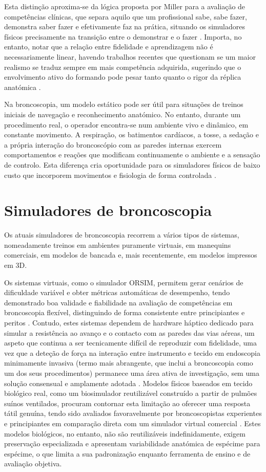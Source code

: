 Esta distinção aproxima-se da lógica proposta por Miller para a avaliação de competências clínicas, que separa aquilo que um profissional sabe, sabe fazer, demonstra saber fazer e efetivamente faz na prática, situando os simuladores físicos precisamente na transição entre o demonstrar e o fazer \parencite{Witheridge2019}. Importa, no entanto, notar que a relação entre fidelidade e aprendizagem não é necessariamente linear, havendo trabalhos recentes que questionam se um maior realismo se traduz sempre em mais competência adquirida, sugerindo que o envolvimento ativo do formando pode pesar tanto quanto o rigor da réplica anatómica \parencite{Pico2026}.

Na broncoscopia, um modelo estático pode ser útil para situações de treinos iniciais de navegação e reconhecimento anatómico. No entanto, durante um procedimento real, o operador encontra-se num ambiente vivo e dinâmico, em constante movimento. A respiração, os batimentos cardíacos, a tosse, a sedação e a própria interação do broncoscópio com as paredes internas exercem comportamentos e reações que modificam continuamente o ambiente e a sensação de controlo. Esta diferença cria oportunidade para os simuladores físicos de baixo custo que incorporem movimentos e fisiologia de forma controlada \parencite{Davoudi2008,Nilsson2017,Fu2023}.

\section{Simuladores de broncoscopia}
Os atuais simuladores de broncoscopia recorrem a vários tipos de sistemas, nomeadamente treinos em ambientes puramente virtuais, em manequins comerciais, em modelos de bancada e, mais recentemente, em modelos impressos em 3D.

Os sistemas virtuais, como o simulador ORSIM, permitem gerar cenários de dificuldade variável e obter métricas automáticas de desempenho, tendo demonstrado boa validade e fiabilidade na avaliação de competências em broncoscopia flexível, distinguindo de forma consistente entre principiantes e peritos \parencite{Baker2016}. Contudo, estes sistemas dependem de hardware háptico dedicado para simular a resistência ao avanço e o contacto com as paredes das vias aéreas, um aspeto que continua a ser tecnicamente difícil de reproduzir com fidelidade, uma vez que a deteção de força na interação entre instrumento e tecido em endoscopia minimamente invasiva (termo mais abrangente, que inclui a broncoscopia como um dos seus procedimentos) permanece uma área ativa de investigação, sem uma solução consensual e amplamente adotada \parencite{Hosseinabadi2021}. Modelos físicos baseados em tecido biológico real, como um biosimulador reutilizável construído a partir de pulmões suínos ventilados, procuram contornar esta limitação ao oferecer uma resposta tátil genuína, tendo sido avaliados favoravelmente por broncoscopistas experientes e principiantes em comparação direta com um simulador virtual comercial \parencite{Garner2019}. Estes modelos biológicos, no entanto, não são reutilizáveis indefinidamente, exigem preservação especializada e apresentam variabilidade anatómica de espécime para espécime, o que limita a sua padronização enquanto ferramenta de ensino e de avaliação objetiva.

